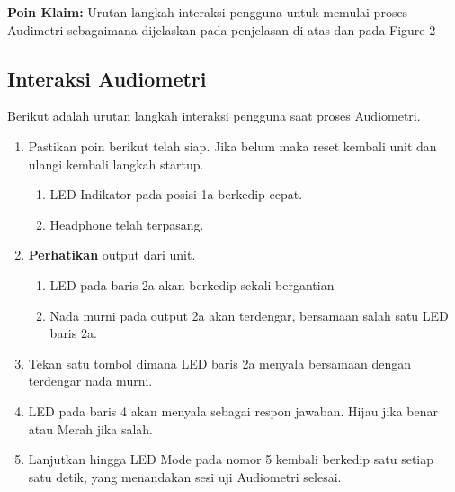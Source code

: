 \documentclass[12pt,]{article}
\begin{document}
	\textbf{Poin Klaim:} Urutan langkah interaksi pengguna untuk memulai proses Audimetri sebagaimana dijelaskan
	pada penjelasan di atas dan pada Figure 2
	
	\newpage
	\subsection{Interaksi Audiometri}
	
	Berikut adalah urutan langkah interaksi pengguna saat proses Audiometri.
	\begin{enumerate}
		\item Pastikan poin berikut telah siap. Jika belum maka reset kembali unit
		dan ulangi kembali langkah startup.
		\begin{enumerate}
			\renewcommand{\theenumi}{\Alph{enumi}}
			
			\item LED Indikator pada posisi 1a berkedip cepat.
			\item Headphone telah terpasang.
		\end{enumerate}
	
		\item \textbf{Perhatikan} output dari unit.
		\begin{enumerate}
			\renewcommand{\theenumi}{\Alph{enumi}}
			
			\item LED pada baris 2a akan berkedip sekali bergantian
			\item Nada murni pada output 2a akan terdengar,
			bersamaan salah satu LED baris 2a.
		\end{enumerate}
	
		\item Tekan satu tombol dimana LED baris 2a menyala bersamaan dengan terdengar nada murni.
		
		\item LED pada baris 4 akan menyala sebagai respon jawaban.
		Hijau jika benar atau Merah jika salah.
		
		\item Lanjutkan hingga LED Mode pada nomor 5 kembali berkedip satu setiap satu detik,
		yang menandakan sesi uji Audiometri selesai.
	\end{enumerate}
	
\end{document}
